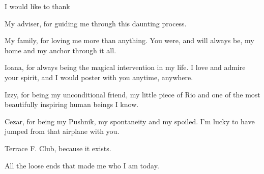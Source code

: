 I would like to thank 

My adviser, for guiding me through this daunting process. \par

My family, for loving me more than anything. You were, and will always be, my home and my anchor through it all. \par

Ioana, for always being the magical intervention in my life. I love and admire your spirit, and I would poster with you anytime, anywhere. \par

Izzy, for being my unconditional friend, my little piece of Rio and one of the most beautifully inspiring human beings I know. \par

Cezar, for being my Pushnik, my spontaneity and my spoiled. I'm lucky to have jumped from that airplane with you. \par

Terrace F. Club, because it exists.\par

All the loose ends that made me who I am today.

